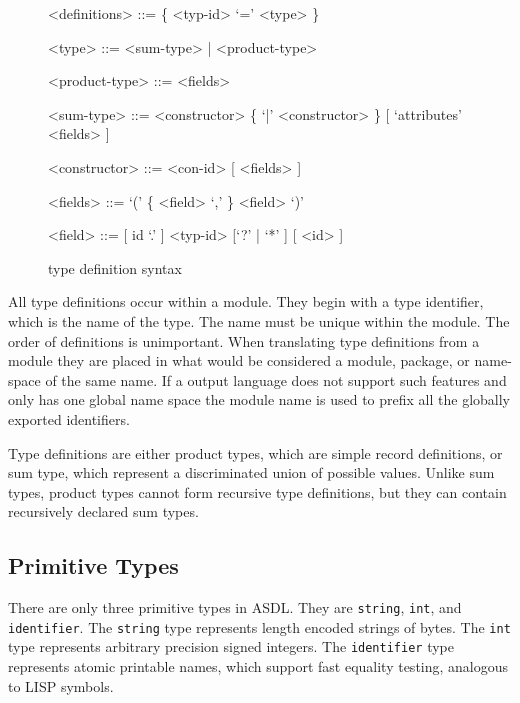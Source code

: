 \begin{figure}[ht]
  \begin{center}
    \begin{grammar}
      <definitions>  ::=  \{ <typ-id> `=' <type> \}

      <type>         ::= <sum-type> | <product-type>

      <product-type> ::= <fields>

      <sum-type>     ::= <constructor> \{ `|' <constructor> \} [ `attributes' <fields> ]

      <constructor>  ::= <con-id> [ <fields> ]

      <fields>       ::= `(' \{ <field>  `,' \} <field> `)'

      <field>        ::= [ id `.' ] <typ-id> [`?' | `*' ]  [ <id> ]
    \end{grammar}
  \end{center}
  \caption{\asdl{} type definition syntax}
\end{figure}%

All type definitions occur within a module.  They begin with a type
identifier, which is the name of the type. The name must be unique within the
module. The order of definitions is unimportant. When translating type
definitions from a module they are placed in what would be considered a
module, package, or name-space of the same name. If a output language does
not support such features and only has one global name space the module name
is used to prefix all the globally exported identifiers.

Type definitions are either product types, which are simple record definitions,
or sum type, which represent a discriminated union of possible values. Unlike
sum types, product types cannot form recursive type definitions, but they can
contain recursively declared sum types.

\subsection{Primitive Types}
There are only three primitive types in ASDL. They
are \lstinline[language=ASDL]!string!, \lstinline[language=ASDL]!int!, and \lstinline[language=ASDL]!identifier!. The \lstinline[language=ASDL]!string! type
represents length encoded strings of bytes. The \lstinline[language=ASDL]!int! type represents
arbitrary precision signed integers. The \lstinline[language=ASDL]!identifier! type represents
atomic printable names, which support fast equality testing, analogous to
LISP symbols.

